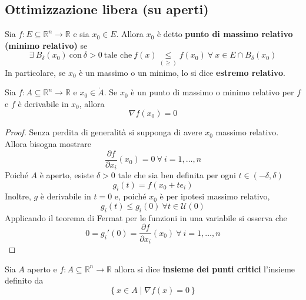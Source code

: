 \subsection{Ottimizzazione libera (su aperti)}
\begin{definition} \label{Def: Max e min relativo}
    Sia $f:E \subseteq \mathbb{R}^n \to \mathbb{R}$ e sia $x_0 \in E$. Allora $x_0$ è detto \textbf{punto di massimo relativo (minimo relativo)} se
    \begin{equation}
        \exists\ B_\delta(x_0)\ \text{con}\ \delta>0\ \text{tale che}\ f(x) \underset{(\geq)}{\leq} f(x_0)\ \forall\ x \in E \cap B_\delta(x_0)
    \end{equation}
    In particolare, se $x_0$ è un massimo o un minimo, lo si dice \textbf{estremo relativo}.
\end{definition}
\begin{theorem}
Sia $f:A \subseteq \mathbb{R}^n  \to \mathbb{R}$ e $x_0 \in \mathring{A}$. Se $x_0$ è un punto di massimo o minimo relativo per $f$ e $f$ è derivabile in $x_0$, allora
\begin{equation}
    \nabla f(x_0)=0
\end{equation}
\end{theorem}
\begin{proof}
    Senza perdita di generalità si supponga di avere $x_0$ massimo relativo. Allora bisogna mostrare
    \begin{equation}
        \frac{\partial f}{\partial x_i}(x_0)=0\ \forall\ i=1, \dots, n
    \end{equation}
    Poiché $A$ è aperto, esiste $\delta>0$ tale che sia ben definita per ogni $t \in (-\delta, \delta)$
    \begin{equation}
        g_i(t)=f(x_0+t e_i)
    \end{equation}
    Inoltre, $g$ è derivabile in $t=0$ e, poiché $x_0$ è per ipotesi massimo relativo, 
    \begin{equation}
        g_i(t) \leq g_i(0)\ \forall t \in \mathcal{U}(0)
    \end{equation}
    Applicando il teorema di Fermat per le funzioni in una variabile si osserva che
    \begin{equation}
        0=g_i'(0)=\frac{\partial f}{\partial x_i}(x_0)\ \forall\ i=1, \dots, n
    \end{equation}
\end{proof}
\begin{definition} \label{Def: Insieme dei punti critici}
    Sia $A$ aperto e $f: A \subseteq \mathbb{R}^n  \to \mathbb{R}$ allora si dice \textbf{insieme dei punti critici} l'insieme definito da
    \begin{equation}
        \left\{x\in A \mid \nabla f(x)=0\right\}
    \end{equation}
\end{definition}
